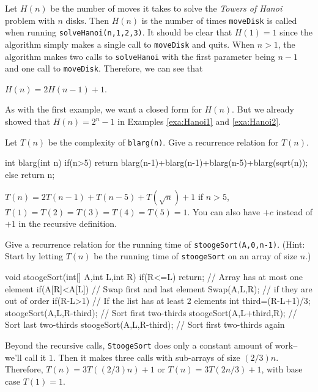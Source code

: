 \begin{exa}
\begin{sol}
Let $H(n)$ be the number of moves it takes to solve the {\em Towers of Hanoi} problem 
with $n$ disks.  
Then $H(n)$ is the number of times \verb+moveDisk+ is called
when running \verb+solveHanoi(n,1,2,3)+.
It should be clear that $H(1)=1$ since the algorithm simply makes a single
call to \verb+moveDisk+ and quits.
When $n>1$, the algorithm makes two calls to \verb+solveHanoi+ with the
first parameter being $n-1$ and one call to \verb+moveDisk+.
Therefore, we can see that

\noindent
\hspace*{2in} $H(n)=2H(n-1)+1.$

\noindent
As with the first example, we want a closed form for $H(n)$.
But we already showed that $H(n)=2^{n}-1$ in Examples \ref{exa:Hanoi1} and \ref{exa:Hanoi2}.
\end{sol}
\end{exa}

\begin{exer}
Let $T(n)$  be the complexity of \verb+blarg(n)+. 
Give a recurrence relation for $T(n)$.
\begin{code}
int blarg(int n) {
     if(n>5) {
        return blarg(n-1)+blarg(n-1)+blarg(n-5)+blarg(sqrt(n));
     }
     else {
        return n;
     }
}
\end{code}
\answerline
\begin{answer}
$T(n)=2 T(n-1)+T(n-5)+T(\sqrt{n})+1$ if $n>5$,
$T(1)=T(2)=T(3)=T(4)=T(5)=1$.
You can also have $+c$ instead of $+1$ in the recursive definition.
\end{answer}
\end{exer}

\begin{exer}\label{exer:stooge}
Give a recurrence relation for the running time of \verb+stoogeSort(A,0,n-1)+.
(Hint: Start by letting $T(n)$ be the running time of \verb+stoogeSort+ on an array of size $n$.)
\begin{code}
  void stoogeSort(int[] A,int L,int R){
      if(R<=L) return; // Array has at most one element
      if(A[R]<A[L]) {  // Swap first and last element 
          Swap(A,L,R); // if they are out of order
      }
      if(R-L>1){ // If the list has at least 2 elements
          int third=(R-L+1)/3;
          stoogeSort(A,L,R-third); // Sort first two-thirds
          stoogeSort(A,L+third,R); // Sort last two-thirds
          stoogeSort(A,L,R-third); // Sort first two-thirds again
      }
  }
\end{code}
\answerline
\begin{answer}
Beyond the recursive calls, \verb+StoogeSort+ does only a constant amount of work--we'll call it $1$.
Then it makes three calls with sub-arrays of size $(2/3)n$.  Therefore, 
$T(n)=3T((2/3)n)+1$ or $T(n)=3T(2n/3)+1$, with base case $T(1)=1$.
\end{answer}
\end{exer}

